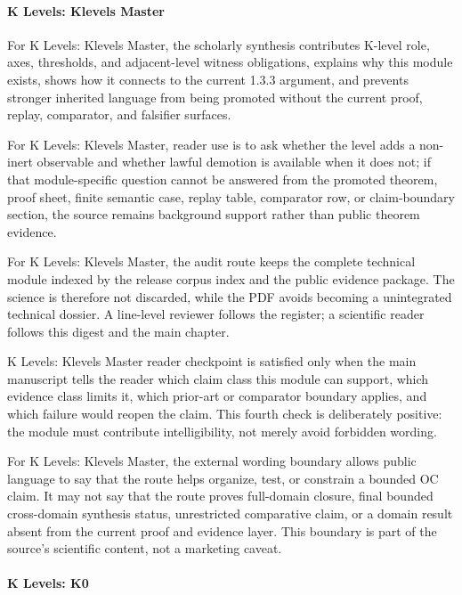\paragraph{K Levels: Klevels Master}

For K Levels: Klevels Master, the scholarly synthesis contributes K-level role, axes, thresholds, and adjacent-level witness obligations, explains why this module exists, shows how it connects to the current 1.3.3 argument, and prevents stronger inherited language from being promoted without the current proof, replay, comparator, and falsifier surfaces.


For K Levels: Klevels Master, reader use is to ask whether the level adds a non-inert observable and whether lawful demotion is available when it does not; if that module-specific question cannot be answered from the promoted theorem, proof sheet, finite semantic case, replay table, comparator row, or claim-boundary section, the source remains background support rather than public theorem evidence.


For K Levels: Klevels Master, the audit route keeps the complete technical module indexed by the release corpus index and the public evidence package. The science is therefore not discarded, while the PDF avoids becoming a unintegrated technical dossier. A line-level reviewer follows the register; a scientific reader follows this digest and the main chapter.


K Levels: Klevels Master reader checkpoint is satisfied only when the main manuscript tells the reader which claim class this module can support, which evidence class limits it, which prior-art or comparator boundary applies, and which failure would reopen the claim. This fourth check is deliberately positive: the module must contribute intelligibility, not merely avoid forbidden wording.


For K Levels: Klevels Master, the external wording boundary allows public language to say that the route helps organize, test, or constrain a bounded OC claim. It may not say that the route proves full-domain closure, final bounded cross-domain synthesis status, unrestricted comparative claim, or a domain result absent from the current proof and evidence layer. This boundary is part of the source's scientific content, not a marketing caveat.


\paragraph{K Levels: K0}

